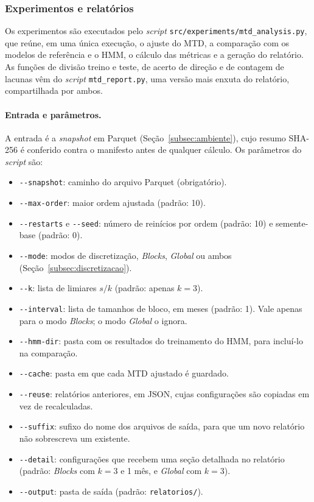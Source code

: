 \documentclass[
    12pt,                %
    openright,           %
    oneside,             %
    a4paper,             %
    english,             %
    brazil               %
]{abntex2}
\begin{document}
\subsubsection{Experimentos e relatórios}
\label{subsubsec:relatorios}

Os experimentos são executados pelo \textit{script} \texttt{src/experiments/mtd\_analysis.py}, que reúne, em uma única execução, o ajuste do MTD, a comparação com os
modelos de referência e o HMM, o cálculo das métricas e a geração do relatório. As funções de divisão treino e teste, de acerto de direção e de contagem de lacunas
vêm do \textit{script} \texttt{mtd\_report.py}, uma versão mais enxuta do relatório, compartilhada por ambos.

\paragraph{Entrada e parâmetros.} A entrada é a \textit{snapshot} em Parquet (Seção~\ref{subsec:ambiente}), cujo resumo SHA-256 é conferido contra o manifesto
antes de qualquer cálculo. Os parâmetros do \textit{script} são:

\begin{itemize}
  \item \texttt{-{}-snapshot}: caminho do arquivo Parquet (obrigatório).
  \item \texttt{-{}-max-order}: maior ordem ajustada (padrão: 10).
  \item \texttt{-{}-restarts} e \texttt{-{}-seed}: número de reinícios por ordem (padrão: 10) e semente-base (padrão: 0).
  \item \texttt{-{}-mode}: modos de discretização, \textit{Blocks}, \textit{Global} ou ambos (Seção~\ref{subsec:discretizacao}).
  \item \texttt{-{}-k}: lista de limiares $s/k$ (padrão: apenas $k = 3$).
  \item \texttt{-{}-interval}: lista de tamanhos de bloco, em meses (padrão: 1). Vale apenas para o modo \textit{Blocks}; o modo \textit{Global} o ignora.
  \item \texttt{-{}-hmm-dir}: pasta com os resultados do treinamento do HMM, para incluí-lo na comparação.
  \item \texttt{-{}-cache}: pasta em que cada MTD ajustado é guardado.
  \item \texttt{-{}-reuse}: relatórios anteriores, em JSON, cujas configurações são copiadas em vez de recalculadas.
  \item \texttt{-{}-suffix}: sufixo do nome dos arquivos de saída, para que um novo relatório não sobrescreva um existente.
  \item \texttt{-{}-detail}: configurações que recebem uma seção detalhada no relatório (padrão: \textit{Blocks} com $k = 3$ e 1 mês, e \textit{Global} com $k = 3$).
  \item \texttt{-{}-output}: pasta de saída (padrão: \texttt{relatorios/}).
\end{itemize}
\end{document}
